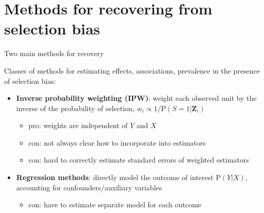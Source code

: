 \documentclass[
  ignorenonframetext,
]{beamer}
\providecommand{\tightlist}{%
  \setlength{\itemsep}{0pt}\setlength{\parskip}{0pt}}
\begin{document}
\hypertarget{methods-for-recovering-from-selection-bias}{%
\section{Methods for recovering from selection
bias}\label{methods-for-recovering-from-selection-bias}}

\begin{frame}{Two main methods for recovery}
\protect\hypertarget{two-main-methods-for-recovery}{}

Classes of methods for estimating effects, associations, prevalence in
the presence of selection bias:

\begin{itemize}
\tightlist
\item
  \textbf{Inverse probability weighting (IPW)}: weight each observed
  unit by the inverse of the probability of selection,
  \(w_i \propto 1/\text{P}(S = 1 | \mathbf{Z}_i)\)

  \begin{itemize}
  \tightlist
  \item
    \textcolor{oxfordgreen}{pro}: weights are independent of \(Y\) and
    \(X\)
  \item
    \textcolor{oxfordred}{con}: not always clear how to incorporate into
    estimators
  \item
    \textcolor{oxfordred}{con}: hard to correctly estimate standard
    errors of weighted estimators \vspace{0.25cm}
  \end{itemize}
\item
  \textbf{Regression methods}: directly model the outcome of interest
  \(\text{P}(Y|X)\), accounting for confounders/auxiliary variables

  \begin{itemize}
  \tightlist
  \item
    \textcolor{oxfordred}{con}: have to estimate separate model for each
    outcome
  \end{itemize}
\end{itemize}

\end{frame}
\end{document}
